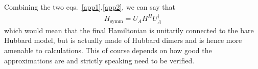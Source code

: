 \documentclass[12pt]{article}
\numberwithin{equation}{section}
\begin{document}
Combining the two eqs.~\ref{app1},\ref{app2}, we can say that
\begin{equation}\begin{aligned}
	H_\text{symm} = U_A H^H U_A^\dagger
\end{aligned}\end{equation}
which would mean that the final Hamiltonian is unitarily connected to the bare Hubbard model, but is actually made of Hubbard dimers and is hence more amenable to calculations. This of course depends on how good the approximations are and strictly speaking need to be verified.

\end{document}
